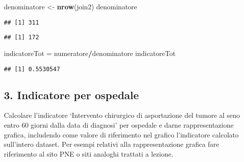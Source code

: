 \documentclass[]{article}
\newenvironment{Shaded}{\begin{snugshade}}{\end{snugshade}}
\newcommand{\DecValTok}[1]{\textcolor[rgb]{0.00,0.00,0.81}{#1}}
\newcommand{\KeywordTok}[1]{\textcolor[rgb]{0.13,0.29,0.53}{\textbf{#1}}}
\newcommand{\NormalTok}[1]{#1}
\newcommand{\OperatorTok}[1]{\textcolor[rgb]{0.81,0.36,0.00}{\textbf{#1}}}
\newcommand{\StringTok}[1]{\textcolor[rgb]{0.31,0.60,0.02}{#1}}
\begin{document}
\begin{Shaded}
\begin{Highlighting}[]
\NormalTok{denominatore <-}\StringTok{ }\KeywordTok{nrow}\NormalTok{(join2)}
\NormalTok{denominatore}
\end{Highlighting}
\end{Shaded}

\begin{verbatim}
## [1] 311
\end{verbatim}

\begin{Shaded}
\end{Shaded}

\begin{verbatim}
## [1] 172
\end{verbatim}

\begin{Shaded}
\begin{Highlighting}[]
\NormalTok{indicatoreTot =}\StringTok{ }\NormalTok{numeratore}\OperatorTok{/}\NormalTok{denominatore}
\NormalTok{indicatoreTot}
\end{Highlighting}
\end{Shaded}

\begin{verbatim}
## [1] 0.5530547
\end{verbatim}

\hypertarget{indicatore-per-ospedale}{%
\subsection{3. Indicatore per ospedale}\label{indicatore-per-ospedale}}

Calcolare l'indicatore `Intervento chirurgico di asportazione del tumore
al seno entro 60 giorni dalla data di diagnosi' per ospedale e darne
rappresentazione grafica, includendo come valore di riferimento nel
grafico l'indicatore calcolato sull'intero dataset. Per esempi relativi
alla rappresentazione grafica fare riferimento al sito PNE o siti
analoghi trattati a lezione.
\end{document}
